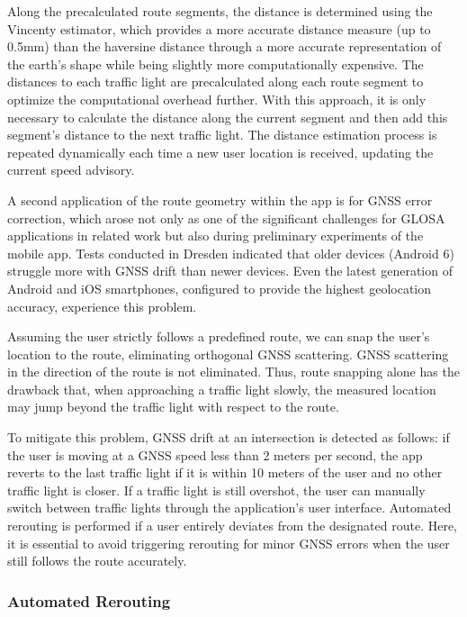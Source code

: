 Along the precalculated route segments, the distance is determined using the Vincenty estimator, which provides a more accurate distance measure (up to 0.5mm) than the haversine distance through a more accurate representation of the earth's shape while being slightly more computationally expensive. The distances to each traffic light are precalculated along each route segment to optimize the computational overhead further. With this approach, it is only necessary to calculate the distance along the current segment and then add this segment's distance to the next traffic light. The distance estimation process is repeated dynamically each time a new user location is received, updating the current speed advisory.

A second application of the route geometry within the app is for GNSS error correction, which arose not only as one of the significant challenges for GLOSA applications in related work but also during preliminary experiments of the mobile app. Tests conducted in Dresden indicated that older devices (Android 6) struggle more with GNSS drift than newer devices. Even the latest generation of Android and iOS smartphones, configured to provide the highest geolocation accuracy, experience this problem.

Assuming the user strictly follows a predefined route, we can snap the user's location to the route, eliminating orthogonal GNSS scattering. GNSS scattering in the direction of the route is not eliminated. Thus, route snapping alone has the drawback that, when approaching a traffic light slowly, the measured location may jump beyond the traffic light with respect to the route. 

To mitigate this problem, GNSS drift at an intersection is detected as follows: if the user is moving at a GNSS speed less than 2 meters per second, the app reverts to the last traffic light if it is within 10 meters of the user and no other traffic light is closer. If a traffic light is still overshot, the user can manually switch between traffic lights through the application's user interface. Automated rerouting is performed if a user entirely deviates from the designated route. Here, it is essential to avoid triggering rerouting for minor GNSS errors when the user still follows the route accurately.

\subsubsection{Automated Rerouting}

